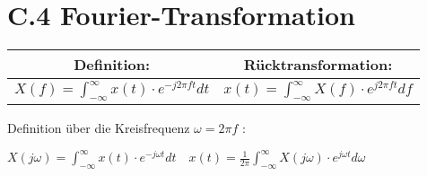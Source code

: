 \section{C.4 Fourier-Transformation}

\begin{tabular}{|c|c|}
\hline Definition: & Rücktransformation: \\
\hline$X(f)=\int_{-\infty}^{\infty} x(t) \cdot e^{-j 2 \pi f t} d t$ & $x(t)=\int_{-\infty}^{\infty} X(f) \cdot e^{j 2 \pi f t} d f$ \\
\hline
\end{tabular}

Definition über die Kreisfrequenz $\omega=2 \pi f$ :

$X(j \omega)=\int_{-\infty}^{\infty} x(t) \cdot e^{-j \omega t} d t \quad x(t)=\frac{1}{2 \pi} \int_{-\infty}^{\infty} X(j \omega) \cdot e^{j \omega t} d \omega$

